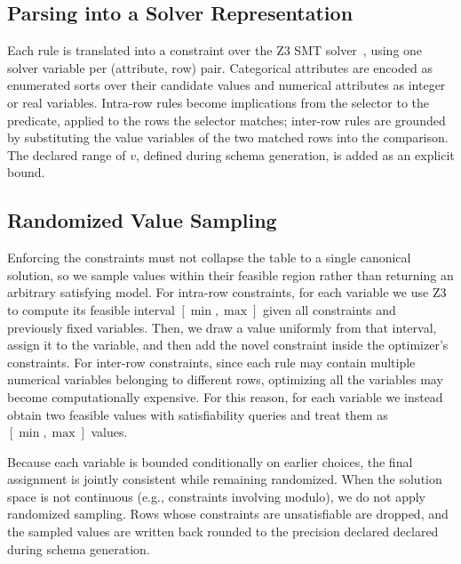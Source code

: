 \subsection{Parsing into a Solver Representation}
\label{app:rule-parsing}

Each rule is translated into a constraint over the Z3 SMT solver~\cite{z3}, using one solver variable per (attribute, row) pair. Categorical attributes are encoded as enumerated sorts over their candidate values and numerical attributes as integer or real
variables. Intra-row rules become implications from the selector to the
predicate, applied to the rows the selector matches; inter-row rules are
grounded by substituting the value variables of the two matched rows into the comparison. The declared range of $v$, defined during schema generation, is added as an explicit bound.

\subsection{Randomized Value Sampling}
\label{app:rule-sampling}

Enforcing the constraints must not collapse the table to a single
canonical solution, so we sample values within their feasible region
rather than returning an arbitrary satisfying model. For intra-row constraints, for each variable we use Z3 to compute its feasible interval $[\min,\max]$ given all constraints and previously fixed variables. Then, we draw a value uniformly from that interval, assign it to the variable, and then add the novel constraint inside the optimizer's constraints. For inter-row constraints, since each rule may contain multiple numerical variables belonging to different rows, optimizing all the variables may become computationally expensive. For this reason, for each variable we instead obtain two feasible values with satisfiability queries and treat them as $[\min,\max]$ values.

Because each variable is bounded conditionally on earlier choices, the
final assignment is jointly consistent while remaining randomized. When
the solution space is not continuous (e.g., constraints involving modulo), we do not apply randomized sampling. Rows whose constraints are
unsatisfiable are dropped, and the sampled values are written back rounded to the precision declared declared during schema generation.

